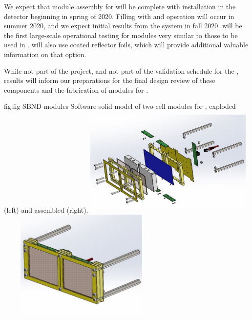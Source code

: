 We expect that module assembly for  will be complete %
with installation in the detector beginning in spring of 2020.  
Filling with  and operation will occur in summer 2020, and we expect initial results from the  system in fall 2020.   will be the first large-scale operational testing for  modules very similar to those to be used in .
 will also use coated reflector foils, which will provide additional valuable information on that   option.  

While not part of the  project, and not part of the validation schedule for the ,  results will inform our preparations for the final design review of these components and the fabrication of modules for .  

\begin{dunefigure}
 {fig:fig-SBND-modules}
 {Software solid model of two-cell  modules for , exploded (left) and assembled (right).}
\includegraphics[angle=0,width=8.4cm,height=5.5cm]{graphics/pds-sbnd-xarapu-exploded.pdf}
\includegraphics[angle=0,width=8.4cm,height=5.5cm]{graphics/pds-sbnd-xarapu-assembled.pdf}
\end{dunefigure}

\subsubsection{}
\label{sec:valid-pdune2}

